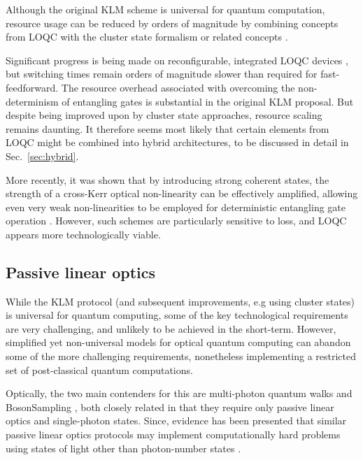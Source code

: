 \documentclass[aps,rmp,twocolumn,amsmath,amssymb,nofootinbib,superscriptaddress,longbibliography,floatfix]{revtex4-1}
\begin{document}
Although the original KLM scheme is universal for quantum computation, resource usage can be reduced by orders of magnitude by combining concepts from LOQC with the cluster state formalism or related concepts \cite{bib:YoranReznik03, bib:Nielsen04, bib:BrowneRudolph05, bib:GilchristHayes05, bib:Lim05, bib:LimBarrett05}.

Significant progress is being made on reconfigurable, integrated LOQC devices \cite{bib:UniversalLOOBrien}, but switching times remain orders of magnitude slower than required for fast-feedforward. The resource overhead associated with overcoming the non-determinism of entangling gates is substantial in the original KLM proposal. But despite being improved upon by cluster state approaches, resource scaling remains daunting. It therefore seems most likely that certain elements from LOQC might be combined into hybrid architectures, to be discussed in detail in Sec.~\ref{sec:hybrid}.

More recently, it was shown that by introducing strong coherent states, the strength of a cross-Kerr optical non-linearity can be effectively amplified, allowing even very weak non-linearities to be employed for deterministic entangling gate operation \cite{bib:Munro05}. However, such schemes are particularly sensitive to loss, and LOQC appears more technologically viable.

%
%

\subsection{Passive linear optics} \label{sec:BS}

While the KLM protocol (and subsequent improvements, e.g using cluster states) is universal for quantum computing, some of the key technological requirements are very challenging, and unlikely to be achieved in the short-term. However, simplified yet non-universal models for optical quantum computing can abandon some of the more challenging requirements, nonetheless implementing a restricted set of post-classical quantum computations.

Optically, the two main contenders for this are multi-photon quantum walks \cite{bib:Aharonov93, bib:Aharonov01, bib:Kempe03, bib:Salvador12, bib:RohdeMultiWalk11} and {\sc BosonSampling} \cite{bib:AaronsonArkhipov10, bib:RohdeIntroBS15}, both closely related in that they require only passive linear optics and single-photon states. Since, evidence has been presented that similar passive linear optics protocols may implement computationally hard problems using states of light other than photon-number states \cite{bib:RandBS, bib:RohdePhotAdd15, bib:RohdeDisp15, bib:RohdeCat15}.
\end{document}
